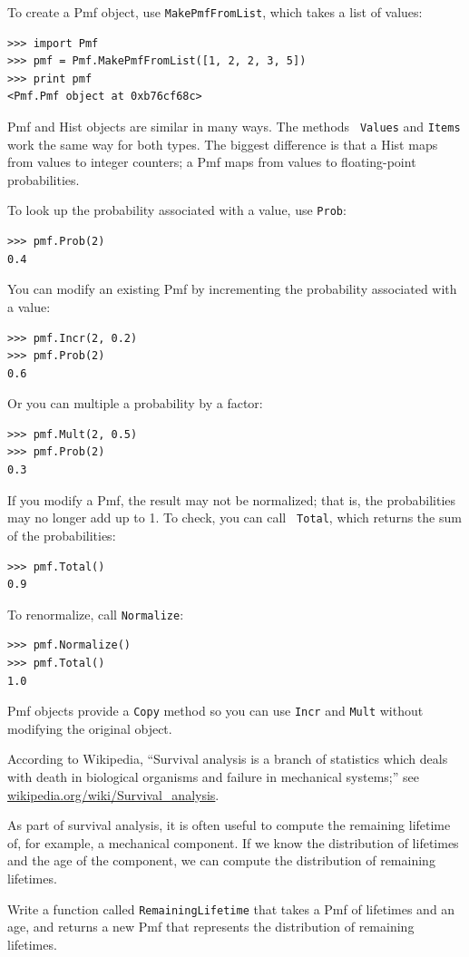 \documentclass[12pt]{book}
\begin{document}
To create a Pmf object, use {\tt MakePmfFromList}, which takes a list
of values:

\begin{verbatim}
>>> import Pmf
>>> pmf = Pmf.MakePmfFromList([1, 2, 2, 3, 5])
>>> print pmf
<Pmf.Pmf object at 0xb76cf68c>
\end{verbatim}

Pmf and Hist objects are similar in many ways.  The methods {\tt
  Values} and {\tt Items} work the same way for both types.  The
biggest difference is that a Hist maps from values to integer
counters; a Pmf maps from values to floating-point probabilities.

To look up the probability associated with a value, use {\tt Prob}:

\begin{verbatim}
>>> pmf.Prob(2)
0.4
\end{verbatim}

You can modify an existing Pmf by incrementing the probability
associated with a value:

\begin{verbatim}
>>> pmf.Incr(2, 0.2)
>>> pmf.Prob(2)
0.6
\end{verbatim}

Or you can multiple a probability by a factor:

\begin{verbatim}
>>> pmf.Mult(2, 0.5)
>>> pmf.Prob(2)
0.3
\end{verbatim}

If you modify a Pmf, the result may not be normalized; that is, the
probabilities may no longer add up to 1.  To check, you can call {\tt
  Total}, which returns the sum of the probabilities:

\begin{verbatim}
>>> pmf.Total()
0.9
\end{verbatim}

To renormalize, call {\tt Normalize}:

\begin{verbatim}
>>> pmf.Normalize()
>>> pmf.Total()
1.0
\end{verbatim}

Pmf objects provide a {\tt Copy} method so you can
use {\tt Incr} and {\tt Mult} without modifying the original object.

\begin{ex}

According to Wikipedia, ``Survival analysis is a branch of statistics
which deals with death in biological organisms and failure in
mechanical systems;'' see \url{wikipedia.org/wiki/Survival_analysis}.

As part of survival analysis, it is often useful to compute the
remaining lifetime of, for example, a mechanical component.  If we
know the distribution of lifetimes and the age of the component,
we can compute the distribution of remaining lifetimes.

Write a function called {\tt RemainingLifetime} that takes a
Pmf of lifetimes and an age, and returns a new Pmf that represents
the distribution of remaining lifetimes.

\end{ex}
\end{document}
